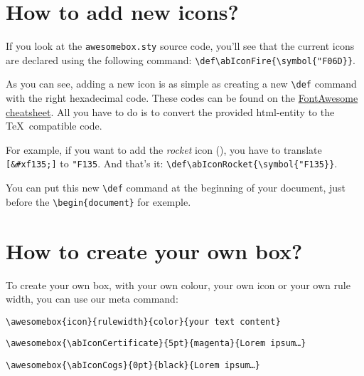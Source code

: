 \documentclass[a4paper,12pt]{article}
\def\abIconRocket{\symbol{"F135}}
\newcommand\hrefcolor[2]{\textcolor{magenta}{\href{#1}{#2}}}
\begin{document}
\section{How to add new icons?}
\label{sec:new-icons}

If you look at the \texttt{awesomebox.sty} source code, you'll see that
the current icons are declared using the following command:
\verb!\def\abIconFire{\symbol{"F06D}}!.

As you can see, adding a new icon is as simple as creating a new
\verb!\def! command with the right hexadecimal code. These codes can be
found on the \hrefcolor{http://fontawesome.io/cheatsheet/}{FontAwesome
  cheatsheet}. All you have to do is to convert the provided html-entity
to the \TeX\ compatible code.

For example, if you want to add the \emph{rocket} icon
({\ABFamily\abIconRocket}), you have to translate \verb![&#xf135;]! to
\texttt{"F135}. And that's it:
\verb!\def\abIconRocket{\symbol{"F135}}!.

You can put this new \verb!\def! command at the beginning of your
document, just before the \verb!\begin{document}! for exemple.

\section{How to create your own box?}

To create your own box, with your own colour, your own icon or your own
rule width, you can use our meta command:

\begin{center}
\verb!\awesomebox{icon}{rulewidth}{color}{your text content}!
\end{center}

\vspace{5mm}

\begin{center}
\verb!\awesomebox{\abIconCertificate}{5pt}{magenta}{Lorem ipsum…}!
\end{center}


\begin{center}
\verb!\awesomebox{\abIconCogs}{0pt}{black}{Lorem ipsum…}!
\end{center}
\end{document}
